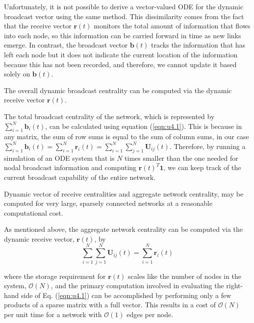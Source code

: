 Unfortunately, it is not possible to derive a vector-valued ODE for the dynamic broadcast vector using the same method. This dissimilarity comes from the fact that the receive vector $\mathbf{r}(t)$ monitors the total amount of information that flows into each node, so this information can be carried forward in time as new links emerge. In contrast, the broadcast vector $\mathbf{b}(t)$ tracks the information that has left each node but it does not indicate the current location of the information because this has not been recorded, and therefore, we cannot update it based solely on $\mathbf{b}(t)$.

\begin{highlightedParagraphC}
 
The overall dynamic broadcast centrality can be computed via the dynamic receive vector $\mathbf{r}(t)$.

\end{highlightedParagraphC}

The total broadcast centrality of the network, which is represented by $\sum_{i=1}^{N} \mathbf{b}_i(t)$, can be calculated using equation (\ref{eqn:u4.1}). This is because in any matrix, the sum of row sums is equal to the sum of column sums, in our case $\sum_{i=1}^{N} \mathbf{b}_i(t) = \sum_{i=1}^{N} \mathbf{r}_i(t)=\sum_{i=1}^{N}\sum_{j=1}^{N} \mathbf{U}_{ij}(t)$. Therefore, by running a simulation of an ODE system that is $N$ times smaller than the one needed for nodal broadcast information and computing $\mathbf{r}(t)^T\mathbf{1}$, we can keep track of the current broadcast capability of the entire network.

\newpage

\begin{highlightedParagraphC}
 
 Dynamic vector of receive centralities and aggregate network centrality, may be computed for very large, sparsely connected networks at a reasonable computational cost. 

\end{highlightedParagraphC}

As mentioned above, the aggregate network centrality can be computed via the dynamic receive vector, $\mathbf{r}(t)$, by $$\sum_{i=1}^{N}\sum_{j=1}^{N} \mathbf{U}_{ij}(t) = \sum_{i=1}^{N} \mathbf{r}_i(t)$$

where the storage requirement for $\mathbf{r}(t)$ scales like the number of nodes in the system, $\mathcal{O}(N)$, and the primary computation involved in evaluating the right-hand side of Eq. (\ref{eqn:u4.1}) can be accomplished by performing only a few products of a sparse matrix with a full vector. This results in a cost of $\mathcal{O}(N)$ per unit time for a network with $\mathcal{O}(1)$ edges per node.

